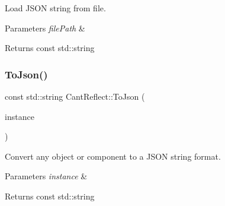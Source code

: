 Load J\+S\+ON string from file. 


\begin{DoxyParams}{Parameters}
{\em file\+Path} & \\
\hline
\end{DoxyParams}
\begin{DoxyReturn}{Returns}
const std\+::string 
\end{DoxyReturn}
\mbox{\label{namespaceCantReflect_a88e14086a9520f73b48c09264bf48320}} 
\subsubsection{\texorpdfstring{To\+Json()}{ToJson()}}
{\footnotesize\ttfamily const std\+::string Cant\+Reflect\+::\+To\+Json (\begin{DoxyParamCaption}\item[{rttr\+::instance}]{instance }\end{DoxyParamCaption})}



Convert any object or component to a J\+S\+ON string format. 


\begin{DoxyParams}{Parameters}
{\em instance} & \\
\hline
\end{DoxyParams}
\begin{DoxyReturn}{Returns}
const std\+::string 
\end{DoxyReturn}
